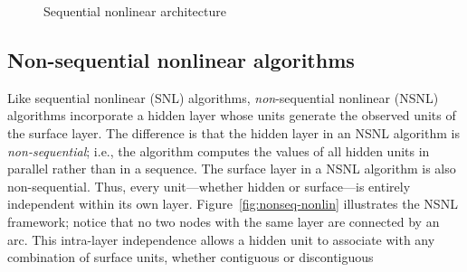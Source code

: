 {\begin{figure}[tb]
\begin{center}
 \end{center}
 \caption{Sequential nonlinear architecture}
 \label{fig:seq-nonlin}
 \end{figure}

\subsection{Non-sequential nonlinear algorithms}
\label{subsec:nonseq-nonlin}
 Like sequential nonlinear (SNL) algorithms, \textit{non}-sequential
 nonlinear (NSNL) algorithms incorporate a hidden layer whose units generate the observed
 units of the surface layer.
The difference is that the hidden layer in an NSNL algorithm is \emph{non-sequential}; 
i.e., the algorithm computes the values of all hidden units in parallel rather than in a sequence.
The surface layer in a NSNL algorithm is also non-sequential.
 Thus, every unit---whether hidden or surface---is entirely independent
 within its own layer. Figure~\ref{fig:nonseq-nonlin} illustrates the NSNL framework; notice that no two nodes with the same layer are connected by an arc.
This intra-layer independence allows a hidden unit to associate with
any combination of surface units, whether contiguous or discontiguous

}
